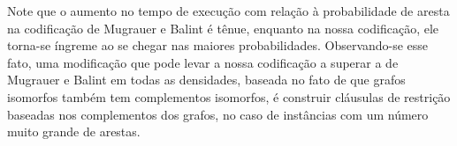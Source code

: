 \documentclass[12pt,a4paper]{article}
\begin{document}
Note que o aumento no tempo de execução com relação à probabilidade de aresta na codificação de Mugrauer e Balint é tênue, enquanto na 
nossa codificação, ele torna-se íngreme ao se chegar nas maiores probabilidades. Observando-se esse fato, uma modificação que pode 
levar a nossa codificação a superar a de Mugrauer e Balint em todas as densidades, baseada no fato de que grafos isomorfos também tem 
complementos isomorfos, é construir cláusulas de restrição baseadas nos complementos dos grafos, no caso de instâncias com um
número muito grande de arestas.



\end{document}
